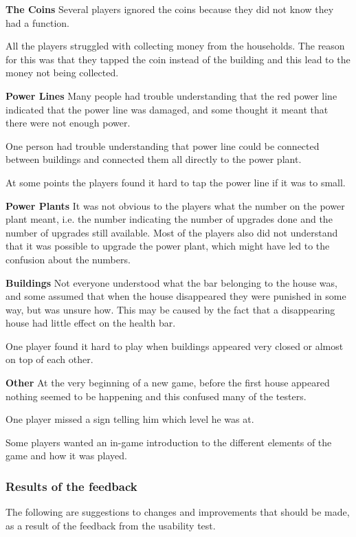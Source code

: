 		\textbf{The Coins}
			Several players ignored the coins because they did not know they had a function.

			All the players struggled with collecting money from the households. The reason for this was that they tapped the coin instead of the building and this lead to the money not being collected.

		\textbf{Power Lines}
			Many people had trouble understanding that the red power line indicated that the power line was damaged, and some thought it meant that there were not enough power.

			One person had trouble understanding that power line could be connected between buildings and connected them all directly to the power plant.

			At some points the players found it hard to tap the power line if it was to small.

		\textbf{Power Plants}
			It was not obvious to the players what the number on the power plant meant, i.e. the number indicating the number of upgrades done and the number of upgrades still available. Most of the players also did not understand that it was possible to upgrade the power plant, which might have led to the confusion about the numbers.

		\textbf{Buildings}
			Not everyone understood what the bar belonging to the house was, and some assumed that when the house disappeared they were punished in some way, but was unsure how. This may be caused by the fact that a disappearing house had little effect on the health bar.

			One player found it hard to play when buildings appeared very closed or almost on top of each other.

		\textbf{Other}
			At the very beginning of a new game, before the first house appeared nothing seemed 
			to be happening and this confused many of the testers.

			One player missed a sign telling him which level he was at.

			Some players wanted an in-game introduction to the different elements of the game and how it was played.

	\subsubsection*{Results of the feedback}

	The following are suggestions to changes and improvements that should be made, as a result of the feedback from the usability test.

